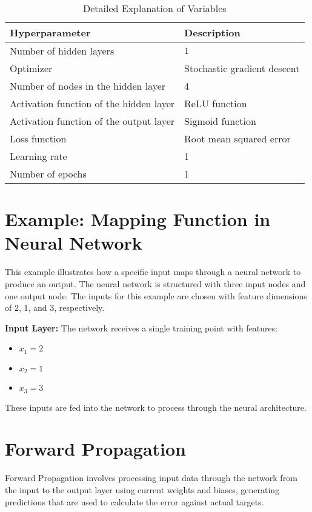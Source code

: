 \documentclass{article}
\begin{document}
\begin{table}[H] %
\centering
\caption{Detailed Explanation of Variables}
\label{tab:variables}
\begin{tabularx}{\textwidth}{AB} %
\toprule

\textbf{Hyperparameter} & \textbf{Description} \\
\midrule
Number of hidden layers & $1$ \\
Optimizer & Stochastic gradient descent \\
Number of nodes in the hidden layer & 4 \\ 
Activation function of the hidden layer & ReLU function \\
Activation function of the output layer & Sigmoid function \\
Loss function & Root mean squared error \\ 
Learning rate & 1 \\ 
Number of epochs & 1 \\ 

\bottomrule
\end{tabularx}
\end{table}

\section{Example: Mapping Function in Neural Network}
This example illustrates how a specific input maps through a neural network to produce an output. The neural network is structured with three input nodes and one output node. The inputs for this example are chosen with feature dimensions of 2, 1, and 3, respectively.

\vspace{5mm}

\noindent \textbf{Input Layer:} The network receives a single training point with features:
    \begin{itemize}
        \item $x_1 = 2$ 
        \item $x_2 = 1$ 
        \item $x_3 = 3$ 
    \end{itemize}
    These inputs are fed into the network to process through the neural architecture.

\section{Forward Propagation}
Forward Propagation involves processing input data through the network from the input to the output layer using current weights and biases, generating predictions that are used to calculate the error against actual targets.
\end{document}
